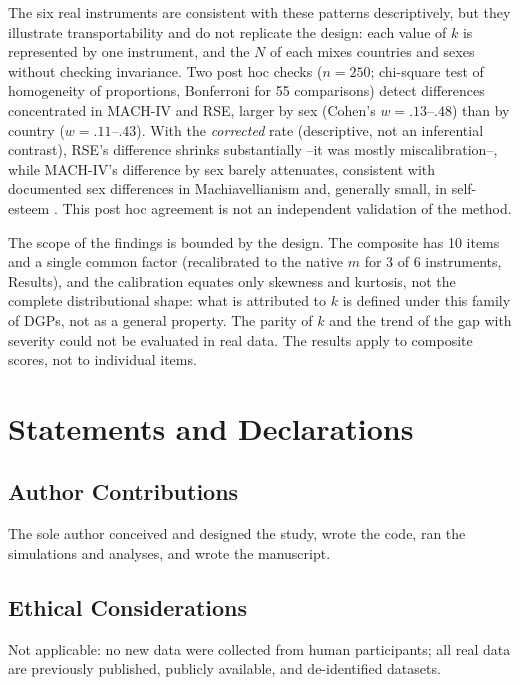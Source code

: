 \documentclass[man,mask,donotrepeattitle,floatsintext]{apa7}
\begin{document}
The six real instruments are consistent with these patterns descriptively, but they illustrate transportability and do not replicate the design: each value of $k$ is represented by one instrument, and the $N$ of each mixes countries and sexes without checking invariance. Two post hoc checks ($n=250$; chi-square test of homogeneity of proportions, Bonferroni for 55 comparisons) detect differences concentrated in MACH-IV and RSE, larger by sex (Cohen's $w=.13$--$.48$) than by country ($w=.11$--$.43$). With the \emph{corrected} rate (descriptive, not an inferential contrast), RSE's difference shrinks substantially --it was mostly miscalibration--, while MACH-IV's difference by sex barely attenuates, consistent with documented sex differences in Machiavellianism \parencite{muris2017,confino2024} and, generally small, in self-esteem \parencite{kling1999}. This post hoc agreement is not an independent validation of the method.

The scope of the findings is bounded by the design. The composite has 10 items and a single common factor (recalibrated to the native $m$ for 3 of 6 instruments, Results), and the calibration equates only skewness and kurtosis, not the complete distributional shape: what is attributed to $k$ is defined under this family of DGPs, not as a general property. The parity of $k$ and the trend of the gap with severity could not be evaluated in real data. The results apply to composite scores, not to individual items.

\section*{Statements and Declarations}

\subsection*{Author Contributions}

The sole author conceived and designed the study, wrote the code, ran the simulations and analyses, and wrote the manuscript.

\subsection*{Ethical Considerations}

Not applicable: no new data were collected from human participants; all real data are previously published, publicly available, and de-identified datasets.
\end{document}
